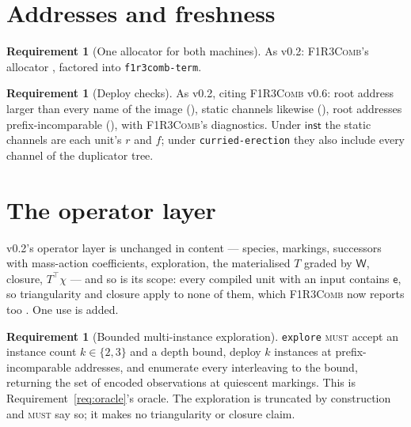\documentclass[11pt,a4paper]{article}
\newcommand{\code}[1]{\texttt{#1}}
\newcommand{\Comb}{\textsc{F1R3Comb}}
\newcommand{\MUST}{\textsc{must}}
\newcommand{\ev}{\mathsf{e}}
\newcommand{\Wt}{\mathsf{W}}
\theoremstyle{definition}
\newtheorem{requirement}[definition]{Requirement}
\theoremstyle{plain}
\newcommand{\inst}{\mathsf{inst}}
\begin{document}
\section{Addresses and freshness}\label{sec:addr}

\begin{requirement}[One allocator for both machines]\label{req:oneallocator}
As v0.2: \Comb's allocator \cite[Req.~9.6]{combspec}, factored into
\code{f1r3comb-term}.
\end{requirement}

\begin{requirement}[Deploy checks]\label{req:deploychecks}
As v0.2, citing \Comb{} v0.6: root address larger than every name of the image
(\cite[Req.~5.28]{combspec}), static channels likewise
(\cite[Req.~5.31]{combspec}), root addresses prefix-incomparable
(\cite[Req.~5.32]{combspec}), with \Comb's diagnostics. Under $\inst$ the static channels are each unit's $r$ and $f$; under
\code{curried-erection} they also include every channel of the duplicator
tree.
\end{requirement}

\section{The operator layer}\label{sec:op}

v0.2's operator layer is unchanged in content --- species, markings,
successors with mass-action coefficients, exploration, the materialised
$T$ graded by $\Wt$, closure, $T^{\top}\chi$ --- and so is its scope: every
compiled unit with an input contains $\ev$, so triangularity and closure apply
to none of them, which \Comb{} now reports too \cite[Req.~10.2]{combspec}. One
use is added.

\begin{requirement}[Bounded multi-instance exploration]\label{req:multiexplore}
\code{explore} \MUST{} accept an instance count $k \in \{2,3\}$ and a depth
bound, deploy $k$ instances at prefix-incomparable addresses, and enumerate
every interleaving to the bound, returning the set of encoded observations at
quiescent markings. This is Requirement~\ref{req:oracle}'s oracle. The
exploration is truncated by construction and \MUST{} say so; it makes no
triangularity or closure claim.
\end{requirement}
\end{document}
